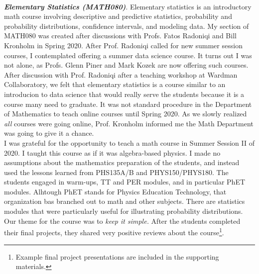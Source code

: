 \documentclass[../../../main.tex]{subfiles}
\begin{document}
\\
\vspace{0.25cm}
\textbf{\textit{Elementary Statistics (MATH080)}}. Elementary statistics is an introductory math course involving descriptive and predictive statistics, probability and probability distributions, confidence intervals, and modeling data.  My section of MATH080 was created after discussions with Profs. Fatos Radoniqi and Bill Kronholm in Spring 2020.  After Prof. Radoniqi called for new summer session courses, I contemplated offering a summer data science course.  It turns out I was not alone, as Profs. Glenn Piner and Mark Kozek are now offering such courses.  After discussion with Prof. Radoniqi after a teaching workshop at Wardman Collaboratory, we felt that elementary statistics is a course similar to an introducion to data science that would really serve the students because it is a course many need to graduate.  It was not standard procedure in the Department of Mathematics to teach online courses until Spring 2020.  As we slowly realized \textit{all} courses were going online, Prof. Kronholm informed me the Math Department was going to give it a chance.
\\
\vspace{0.25cm}
I was grateful for the opportunity to teach a math course in Summer Session II of 2020.  I taught this course as if it was algebra-based physics.  I made no assumptions about the mathematics preparation of the students, and instead used the lessons learned from PHS135A/B and PHYS150/PHYS180.  The students engaged in warm-ups, TT and PER modules, and in particular PhET modules.  Alhtough PhET stands for Physics Education Technology, that organization bas branched out to math and other subjects.  There are statistics modules that were particularly useful for illustrating probability distributions.  Our theme for the course was to \textit{keep it simple.}  After the students completed their final projects, they shared very positive reviews about the course\footnote{Example final project presentations are included in the supporting materials.}.
\end{document}
